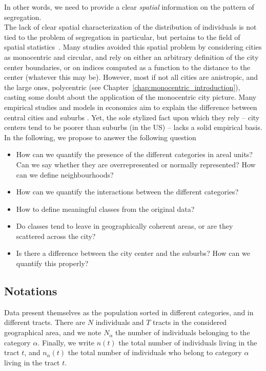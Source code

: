 In other words, we need to provide a clear {\it spatial} information on the
pattern of segregation.\\



The lack of clear spatial characterization of the distribution of individuals is
not tied to the problem of segregation in particular, but pertains to the field
of spatial statistics~\cite{Ripley:1981}. Many studies avoided this spatial
problem by considering cities as monocentric and circular, and rely on either an
arbitrary definition of the city center boundaries, or on indices computed as a
function to the distance to the center (whatever this may be). However, most if
not all cities are anistropic, and the large ones, polycentric
(see Chapter~\ref{chap:monocentric_introduction}), casting some doubt about
the application of the monocentric city picture. Many empirical studies and
models in economics aim to explain the difference between central cities and
suburbs \cite{Glaeser:2008, Brueckner:1999}. Yet, the sole stylized fact upon
which they rely -- city centers tend to be poorer than suburbs (in the US) --
lacks a solid empirical basis.\\

In the following, we propose to answer the following question

\begin{itemize}
    \item How can we quantify the presence of the different categories in areal
        units? Can we say whether they are overrepresented or normally
        represented? How can we define neighbourhoods?
    \item How can we quantify the interactions between the different categories?
    \item How to define meaningful classes from the original data?
    \item Do classes tend to leave in geographically coherent areas, or are they
        scattered across the city?
    \item Is there a difference between the city center and the suburbs? How
        can we quantify this properly?
\end{itemize}

\subsection{Notations}
\label{sub:notations}

Data present themselves as the population sorted in different categories, and in
different tracts. There are $N$ individuals and  $T$ tracts in the considered geographical area, and
we note $N_\alpha$ the number of individuals belonging to the category $\alpha$.
Finally, we write $n(t)$ the total number of individuals living in the tract
$t$, and $n_\alpha(t)$ the total number of individuals who belong to category
$\alpha$ living in the tract $t$.



